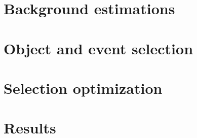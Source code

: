 \section{Background estimations}\label{sswwupgrade:background}


\section{Object and event selection}\label{sswwupgrade:object_event_selection}


\section{Selection optimization}\label{sswwupgrade:optimization}


\section{Results}\label{sswwupgrade:results}

